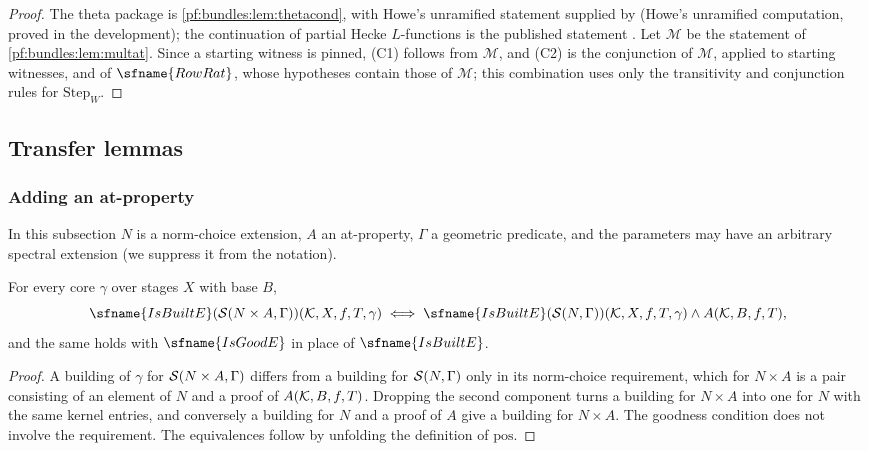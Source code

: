 \begin{proof}
The theta package is \cref{pf:bundles:lem:thetacond}, with Howe's unramified statement supplied by
 (Howe's unramified computation, proved in the development); the continuation of partial
Hecke $L$-functions is the published statement . Let $\mathcal M$
be the statement of \cref{pf:bundles:lem:multat}. Since a starting witness is pinned, (C1) follows from $\mathcal M$, and (C2) is the
conjunction of $\mathcal M$, applied to starting witnesses, and of $\sfname{RowRat}$, whose hypotheses contain those of $\mathcal M$; this
combination uses only the transitivity and conjunction rules for $\mathrm{Step}_W$.
\end{proof}

\subsection{Transfer lemmas}\label{pf:bundles:transfer}

\subsubsection{Adding an at-property}\label{pf:bundles:atprop}

In this subsection $N$ is a norm-choice extension, $A$ an at-property, $\Gamma$ a geometric predicate, and the parameters may have
an arbitrary spectral extension (we suppress it from the notation).

\begin{lemma}\label{pf:bundles:lem:builtiff}
For every core $\gamma$ over stages $X$ with base $B$,
\[
\sfname{IsBuiltE}(\bundS(N\times A,\Gamma))(\bundK,X,f,T,\gamma)\iff\sfname{IsBuiltE}(\bundS(N,\Gamma))(\bundK,X,f,T,\gamma)\wedge
A(\bundK,B,f,T),
\]
and the same holds with $\sfname{IsGoodE}$ in place of $\sfname{IsBuiltE}$.
\end{lemma}

\begin{proof}
A building of $\gamma$ for $\mathcal S(N\times A,\Gamma)$ differs from a building for $\mathcal S(N,\Gamma)$ only in its norm-choice requirement,
which for $N\times A$ is a pair consisting of an element of $N$ and a proof of $A(\mathcal K,B,f,T)$. Dropping the second component turns a
building for $N\times A$ into one for $N$ with the same kernel entries, and conversely a building for $N$ and a proof of $A$ give a
building for $N\times A$. The goodness condition does not involve the requirement. The equivalences follow by unfolding the definition of
$\mathrm{pos}$.
\end{proof}

